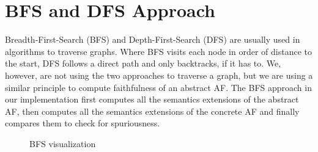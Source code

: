 \section{BFS and DFS Approach}
\label{sec:ImplementationsBFSandDFSApproach}
Breadth-First-Search (BFS) and Depth-First-Search (DFS) are usually used in algorithms to traverse graphs. Where BFS visits each node in order of distance to the start, DFS follows a direct path and only backtracks, if it has to. We, however, are not using the two approaches to traverse a graph, but we are using a similar principle to compute faithfulness of an abstract AF. The BFS approach in our implementation first computes all the semantics extensions of the abstract AF, then computes all the semantics extensions of the concrete AF and finally compares them to check for spuriousness.

\begin{figure}[h!]
    \centering
    \caption{BFS visualization}
    \label{fig:ImplementationBFSVisualization}
\end{figure}




